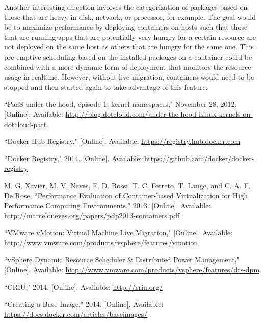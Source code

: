 \documentclass[\myfontsize, letterpaper]{article}
\begin{document}
Another interesting direction involves the categorization of packages based on those that are heavy in disk, network, or processor, for example. The goal would be to maximize performance by deploying containers on hosts such that those that are running apps that are potentially very hungry for a certain resource are not deployed on the same host as others that are hungry for the same one. This pre-emptive scheduling based on the installed packages on a container could be combined with a more dynamic form of deployment that monitors the resource usage in realtime. However, without live migration, containers would need to be stopped and then started again to take advantage of this feature.

\begin{thebibliography}{99}

``PaaS under the hood, episode 1: kernel namespaces," November 28, 2012. [Online]. Available: \href{http://blog.dotcloud.com/under-the-hood-Linux-kernels-on-dotcloud-part}{http://blog.dotcloud.com/under-the-hood-Linux-kernels-on-dotcloud-part}

``Docker Hub Registry," [Online]. Available: \href{https://registry.hub.docker.com}{https://registry.hub.docker.com}

``Docker Registry," 2014. [Online]. Available: \href{https://github.com/docker/docker-registry}{https://github.com/docker/docker-registry}

M. G. Xavier, M. V. Neves, F. D. Rossi, T. C. Ferreto, T. Lange, and C. A. F. De Rose, ``Performance Evaluation of Container-based Virtualization for High Performance Computing Environments," 2013. [Online]. Available: \href{http://marceloneves.org/papers/pdp2013-containers.pdf}{http://marceloneves.org/papers/pdp2013-containers.pdf}

``VMware vMotion: Virtual Machine Live Migration," [Online]. Available: \href{http://www.vmware.com/products/vsphere/features/vmotion}{http://www.vmware.com/products/vsphere/features/vmotion}

``vSphere Dynamic Resource Scheduler \& Distributed Power Management," [Online]. Available: \href{http://www.vmware.com/products/vsphere/features/drs-dpm}{http://www.vmware.com/products/vsphere/features/drs-dpm}

``CRIU," 2014. [Online]. Available: \href{http://criu.org/}{http://criu.org/}

``Creating a Base Image," 2014. [Online]. Available: \href{https://docs.docker.com/articles/baseimages/}{https://docs.docker.com/articles/baseimages/}


\end{thebibliography}
\end{document}
